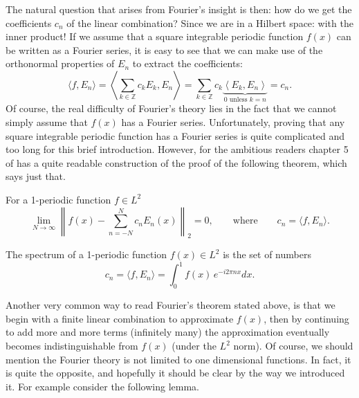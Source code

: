 The natural question that arises from Fourier's insight is then: how do we get
the coefficients $c_n$ of the linear combination? Since we are in a Hilbert
space: with the inner product! If we assume that a square integrable periodic
function $f(x)$ can be written as a Fourier series, it is easy to see that we
can make use of the orthonormal properties of $E_n$ to extract the
coefficients:
\begin{equation*}
  \langle f, E_n \rangle
    = \left \langle \sum_{k \in\mathbb{Z}} c_k E_k , E_n \right \rangle
    = \sum_{k \in\mathbb{Z}}  c_k \underbrace{
      \left \langle E_k , E_n \right \rangle
    }_{ 0 \text{ unless } k = n}
    = c_n.
\end{equation*}
Of course, the real difficulty of Fourier's theory lies in the fact that we
cannot simply assume that $f(x)$ has a Fourier series. Unfortunately, proving
that any square integrable periodic function has a Fourier series is quite
complicated and too long for this brief introduction. However, for the
ambitious readers chapter 5 of \cite{tao_analysis_2016} has a quite readable
construction of the proof of the following theorem, which says just that.

\begin{theorem}
  \label{kugel:thm:fourier-theorem}
  For a 1-periodic function $f \in L^2$
  \begin{equation*}
    \lim_{N \to \infty} \left \|
      f(x) - \sum_{n = -N}^N c_n E_n(x) 
    \right \|_2 = 0,
    \qquad\text{where}\qquad
    c_n = \langle f, E_n \rangle.
  \end{equation*}
\end{theorem}

\begin{definition}[Spectrum]
  The spectrum of a 1-periodic function $f(x) \in L^2$ is the set of numbers
  \begin{equation*}
    c_n = \langle f, E_n \rangle
      = \int_0^1 f(x) \, e^{-i2\pi nx} dx.
  \end{equation*}
\end{definition}
\fi

Another very common way to read Fourier's theorem stated above, is that we
begin with a finite linear combination to approximate $f(x)$, then by
continuing to add more and more terms (infinitely many) the approximation
eventually becomes indistinguishable from $f(x)$ (under the $L^2$ norm). Of
course, we should mention the Fourier theory is not limited to one dimensional
functions.  In fact, it is quite the opposite, and hopefully it should be
clear by the way we introduced it. For example consider the following lemma.

